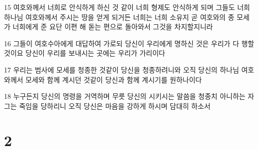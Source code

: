 \par 15 여호와께서 너희로 안식하게 하신 것 같이 너희 형제도 안식하게 되며 그들도 너희 하나님 여호와께서 주시는 땅을 얻게 되거든 너희는 너희 소유지 곧 여호와의 종 모세가 너희에게 준 요단 이편 해 돋는 편으로 돌아와서 그것을 차지할지니라
\par 16 그들이 여호수아에게 대답하여 가로되 당신이 우리에게 명하신 것은 우리가 다 행할 것이요 당신이 우리를 보내시는 곳에는 우리가 가리이다
\par 17 우리는 범사에 모세를 청종한 것같이 당신을 청종하려니와 오직 당신의 하나님 여호와께서 모세와 함께 계시던 것같이 당신과 함께 계시기를 원하나이다
\par 18 누구든지 당신의 명령을 거역하며 무릇 당신의 시키시는 말씀을 청종치 아니하는 자 그는 죽임을 당하리니 오직 당신은 마음을 강하게 하시며 담대히 하소서

\chapter{2}

